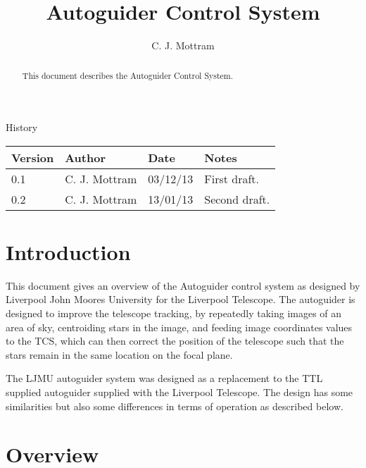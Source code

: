 \documentclass[10pt,a4paper]{article}
\title{Autoguider Control System}
\author{C. J. Mottram}
\date{}
\begin{document}
\thispagestyle{empty}
\maketitle
\begin{abstract}
This document describes the Autoguider Control System.
\end{abstract}
\centerline{\Large History}
\begin{center}
\begin{tabular}{|l|l|l|p{15em}|}
\hline
{\bf Version} & {\bf Author} & {\bf Date} & {\bf Notes} \\
\hline
0.1 & C. J. Mottram & 03/12/13 & First draft. \\
0.2 & C. J. Mottram & 13/01/13 & Second draft. \\
\hline
\end{tabular}
\end{center}

\newpage
\tableofcontents
\listoffigures
\listoftables
\newpage

\section{Introduction}
This document gives an overview of the Autoguider control system as designed by Liverpool John Moores University for
the Liverpool Telescope. The autoguider is designed to improve the telescope tracking, by repeatedly taking images of an area of sky, centroiding stars in the image, and feeding image coordinates values to the TCS, which can then correct the position of the telescope such that the stars remain in the same location on the focal plane.

The LJMU autoguider system was designed as a replacement to the TTL supplied autoguider supplied with the Liverpool Telescope. The design has some similarities but also some differences in terms of operation as described below.

\section{Overview}
\end{document}
